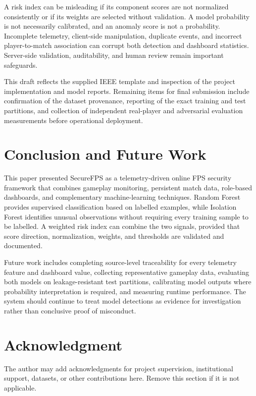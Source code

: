 \documentclass[conference]{IEEEtran}
\begin{document}
A risk index can be misleading if its component scores are not normalized consistently or if its weights are selected without validation. A model probability is not necessarily calibrated, and an anomaly score is not a probability. Incomplete telemetry, client-side manipulation, duplicate events, and incorrect player-to-match association can corrupt both detection and dashboard statistics. Server-side validation, auditability, and human review remain important safeguards.

This draft reflects the supplied IEEE template and inspection of the project implementation and model reports. Remaining items for final submission include confirmation of the dataset provenance, reporting of the exact training and test partitions, and collection of independent real-player and adversarial evaluation measurements before operational deployment.

\section{Conclusion and Future Work}
This paper presented SecureFPS as a telemetry-driven online FPS security framework that combines gameplay monitoring, persistent match data, role-based dashboards, and complementary machine-learning techniques. Random Forest provides supervised classification based on labelled examples, while Isolation Forest identifies unusual observations without requiring every training sample to be labelled. A weighted risk index can combine the two signals, provided that score direction, normalization, weights, and thresholds are validated and documented.

Future work includes completing source-level traceability for every telemetry feature and dashboard value, collecting representative gameplay data, evaluating both models on leakage-resistant test partitions, calibrating model outputs where probability interpretation is required, and measuring runtime performance. The system should continue to treat model detections as evidence for investigation rather than conclusive proof of misconduct.

\section*{Acknowledgment}
The author may add acknowledgments for project supervision, institutional support, datasets, or other contributions here. Remove this section if it is not applicable.
\end{document}
